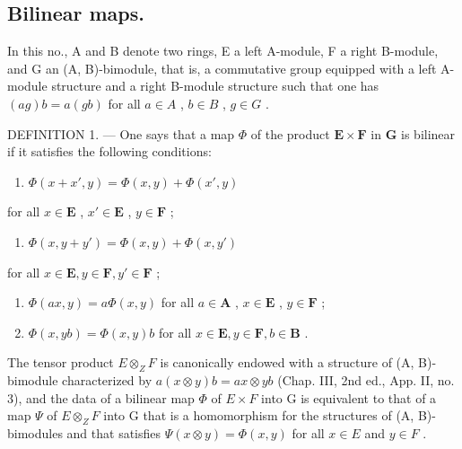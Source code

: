 \subsection{Bilinear maps.}

In this no., A and B denote two rings, E a left A-module, F a right B-module, and G an (A, B)-bimodule, that is, a commutative group equipped with a left A-module structure and a right B-module structure such that one has \((ag)b = a(gb)\) for all \(a \in A\) , \(b \in B\) , \(g \in G\) .

DEFINITION 1. --- One says that a map \(\Phi\) of the product \(\mathbf{E} \times \mathbf{F}\) in \(\mathbf{G}\) is bilinear if it satisfies the following conditions:

\begin{enumerate}
\def\labelenumi{(\arabic{enumi})}
\tightlist
\item
  \(\Phi(x + x', y) = \Phi(x, y) + \Phi(x', y)\)
\end{enumerate}

for all \(x \in \mathbf{E}\) , \(x' \in \mathbf{E}\) , \(y \in \mathbf{F}\) ;

\begin{enumerate}
\def\labelenumi{(\arabic{enumi})}
\setcounter{enumi}{1}
\tightlist
\item
  \(\Phi(x, y + y') = \Phi(x, y) + \Phi(x, y')\)
\end{enumerate}

for all \(x \in \mathbf{E}, y \in \mathbf{F}, y' \in \mathbf{F}\) ;

\begin{enumerate}
\def\labelenumi{(\arabic{enumi})}
\setcounter{enumi}{2}
\item
  \(\Phi(ax, y) = a\Phi(x, y)\) for all \(a \in \mathbf{A}\) , \(x \in \mathbf{E}\) , \(y \in \mathbf{F}\) ;
\item
  \(\Phi(x, yb) = \Phi(x, y)b\) for all \(x \in \mathbf{E}, y \in \mathbf{F}, b \in \mathbf{B}\) .
\end{enumerate}

The tensor product \(E \otimes_{Z} F\) is canonically endowed with a structure of (A, B)-bimodule characterized by \(a(x \otimes y)b = ax \otimes yb\) (Chap. III, 2nd ed., App. II, no. 3), and the data of a bilinear map \(\Phi\) of \(E \times F\) into G is equivalent to that of a map \(\Psi\) of \(E \otimes_{Z} F\) into G that is a homomorphism for the structures of (A, B)-bimodules and that satisfies \(\Psi(x \otimes y) = \Phi(x, y)\) for all \(x \in E\) and \(y \in F\) .

